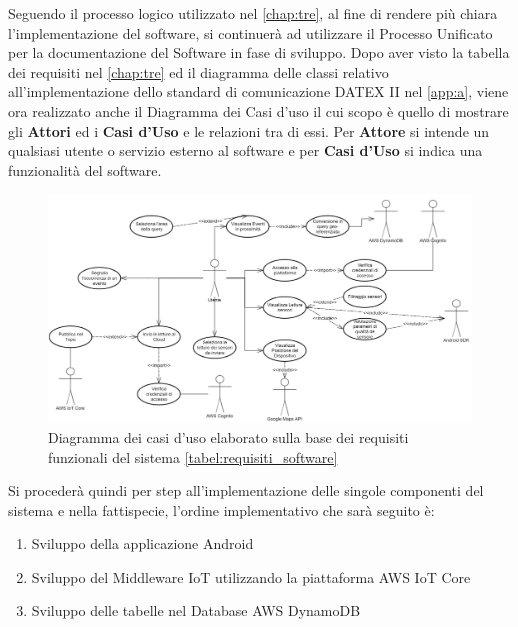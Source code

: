 Seguendo il processo logico utilizzato nel \autoref{chap:tre}, al fine di rendere più chiara l'implementazione del software, si continuerà ad utilizzare il Processo Unificato per la documentazione del Software in fase di sviluppo. Dopo aver visto la tabella dei requisiti nel \autoref{chap:tre} ed il diagramma delle classi relativo all'implementazione dello standard di comunicazione DATEX II nel \autoref{app:a}, viene ora realizzato anche il Diagramma dei Casi d'uso il cui scopo è quello di mostrare gli \textbf{Attori} ed i \textbf{Casi d'Uso} e le relazioni tra di essi. Per \textbf{Attore} si intende un qualsiasi utente o servizio esterno al software e per \textbf{Casi d'Uso} si indica una funzionalità del software.\\
\begin{figure}
	\begin{center}
		\includegraphics[width=1\columnwidth]{images/casiuso}
	\end{center}
	\caption{Diagramma dei casi d'uso elaborato sulla base dei requisiti funzionali del sistema \autoref{tabel:requisiti_software}}
	\label{fig:casiuso}
\end{figure}
Si procederà quindi per step all'implementazione delle singole componenti del sistema e nella fattispecie, l'ordine implementativo che sarà seguito è:
\begin{enumerate}
	\item Sviluppo della applicazione Android
	\item Sviluppo del Middleware IoT utilizzando la piattaforma AWS IoT Core
	\item Sviluppo delle tabelle nel Database AWS DynamoDB
\end{enumerate}

